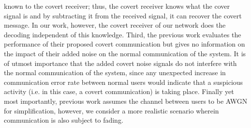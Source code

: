 known to the covert receiver; thus, the covert receiver knows what the cover signal is and by subtracting it from the received signal, it can recover the covert message. In our work, however, the covert receiver of our network does the decoding independent of this knowledge. Third, the previous work evaluates the performance of their proposed covert communication but gives no information on the impact of their added noise on the normal communication of the system. It is of utmost importance that the added covert noise signals do not interfere with the normal communication of the system, since any unexpected increase in communication error rate between normal users would indicate that a suspicious activity (i.e. in this case, a covert communication) is taking place. Finally yet most importantly, previous work assumes the channel between users to be AWGN for simplification, however, we consider a more realistic scenario wherein communication is also subject to fading.
